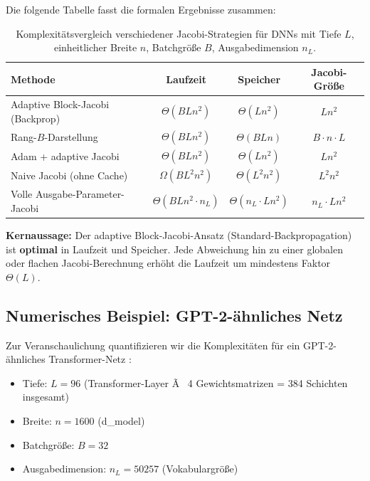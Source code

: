 ﻿\documentclass[a4paper,12pt]{article}
\theoremstyle{definition}
\begin{document}
Die folgende Tabelle fasst die formalen Ergebnisse zusammen:

\begin{table}[h!]
	\centering
	\renewcommand{\arraystretch}{1.4}
	\begin{tabular}{|l|c|c|c|}
		\toprule
		\textbf{Methode} & \textbf{Laufzeit} & \textbf{Speicher} & \textbf{Jacobi-Größe} \\
		\midrule
		Adaptive Block-Jacobi (Backprop) & $\Theta(BLn^2)$ & $\Theta(Ln^2)$ & $Ln^2$ \\
		Rang-$B$-Darstellung & $\Theta(BLn^2)$ & $\Theta(BLn)$ & $B \cdot n \cdot L$ \\
		Adam + adaptive Jacobi & $\Theta(BLn^2)$ & $\Theta(Ln^2)$ & $Ln^2$ \\
		Naive Jacobi (ohne Cache) & $\Omega(BL^2n^2)$ & $\Theta(L^2n^2)$ & $L^2n^2$ \\
		Volle Ausgabe-Parameter-Jacobi & $\Theta(BLn^2 \cdot n_L)$ & $\Theta(n_L \cdot Ln^2)$ & $n_L \cdot Ln^2$ \\
		\bottomrule
	\end{tabular}
	\caption{Komplexitätsvergleich verschiedener Jacobi-Strategien für DNNs mit Tiefe $L$, einheitlicher Breite $n$, Batchgröße $B$, Ausgabedimension $n_L$.}
	\label{tab:complexity}
\end{table}

\textbf{Kernaussage:} Der adaptive Block-Jacobi-Ansatz (Standard-Backpropagation) ist \textbf{optimal} in Laufzeit und Speicher. Jede Abweichung hin zu einer globalen oder flachen Jacobi-Berechnung erhöht die Laufzeit um mindestens Faktor $\Theta(L)$.

\subsection{Numerisches Beispiel: GPT-2-ähnliches Netz}

Zur Veranschaulichung quantifizieren wir die Komplexitäten für ein GPT-2-ähnliches Transformer-Netz \cite{LeCun2015}:

\begin{itemize}
	\item Tiefe: $L = 96$ (Transformer-Layer Ã  4 Gewichtsmatrizen = 384 Schichten insgesamt)
	\item Breite: $n = 1600$ (d\_model)
	\item Batchgröße: $B = 32$
	\item Ausgabedimension: $n_L = 50257$ (Vokabulargröße)
\end{itemize}
\end{document}
